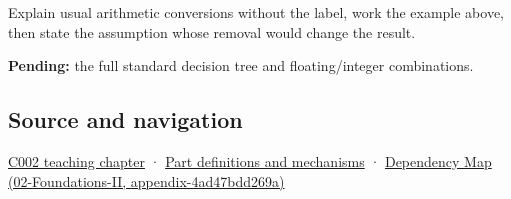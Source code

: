 Explain usual arithmetic conversions without the label, work the example above, then state the assumption whose removal would change the result.

\textbf{Pending:} the full standard decision tree and floating/integer combinations.

\subsection{Source and navigation}\label{appendix-5e2d663adf7f-source-and-navigation}

\hyperref[01-foundations-i-ch001-arithmetic-becomes-a-policy]{C002 teaching chapter} · \hyperref[appendix-fd090d982a15]{Part definitions and mechanisms} · \href{../02-Foundations-II/main.pdf\#nameddest=appendix-4ad47bdd269a}{Dependency Map (02-Foundations-II, appendix-4ad47bdd269a)}
